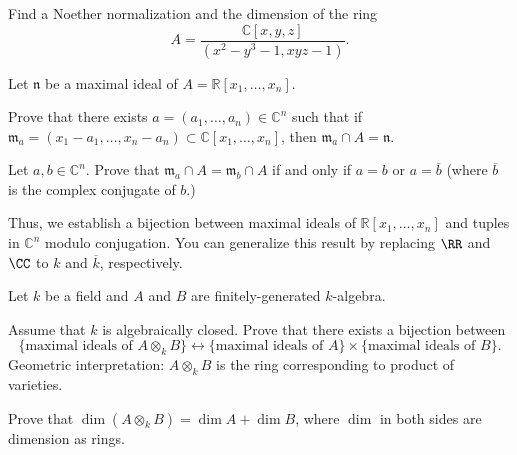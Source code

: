 \begin{problem}
Find a Noether normalization and the dimension of the ring
$$A = \frac{\mathbb C[x,y,z]}{(x^2-y^3-1, xyz-1)}.$$
\end{problem}
\begin{problem}
\label{prob:generalized_nullstellensatz}
Let $\mathfrak n$ be a maximal ideal of $A=\mathbb R[x_1,\dots,x_n]$.
\begin{alphenum}
\item Prove that there exists $a=(a_1,\dots,a_n)\in\mathbb C^n$ such that if $\mathfrak m_a = (x_1-a_1,\dots,x_n-a_n)\subset\mathbb C[x_1,\dots,x_n]$, then $\mathfrak m_a\cap A = \mathfrak n$.
\item Let $a,b\in\mathbb C^n$. Prove that $\mathfrak m_a \cap A= \mathfrak m_b\cap A$ if and only if $a=b$ or $a=\overline b$ (where $\overline b$ is the complex conjugate of $b$.)
\end{alphenum}
Thus, we establish a bijection between maximal ideals of $\mathbb R[x_1,\dots,x_n]$ and tuples in $\mathbb C^n$ modulo conjugation. 
You can generalize this result by replacing $\RR$ and $\CC$
to $k$ and $\overline k$, respectively.
\end{problem}
\begin{problem}
Let $k$ be a field and $A$ and $B$ are finitely-generated $k$-algebra.
\begin{alphenum}
\item Assume that $k$ is algebraically closed.
Prove that there exists a bijection between 
$$\{\text{maximal ideals of }A\otimes_k B\} 
\longleftrightarrow 
\{\text{maximal ideals of }A\}
\times \{\text{maximal ideals of }B\}.$$
Geometric interpretation: $A\otimes_k B$
is the ring corresponding to product of varieties.
\item Prove that $\dim(A\otimes_k B) = \dim A + \dim B$,
where $\dim$ in both sides are dimension as rings.
\end{alphenum}
\end{problem}
